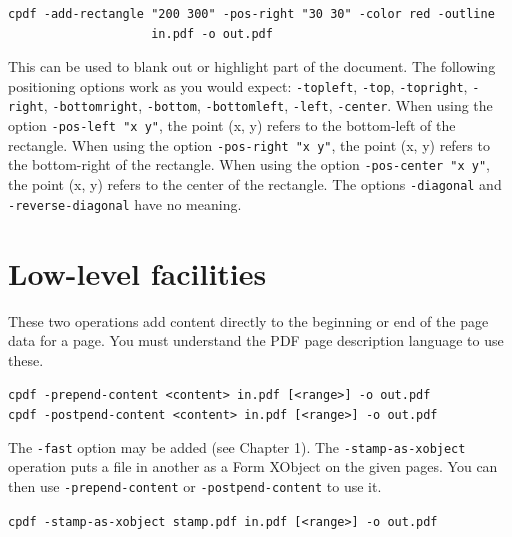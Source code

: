 \documentclass{book}
\begin{document}
\begin{framed}
  \small\begin{verbatim}
cpdf -add-rectangle "200 300" -pos-right "30 30" -color red -outline
                    in.pdf -o out.pdf\end{verbatim}
\end{framed}

\noindent This can be used to blank out or highlight part of the document. The following positioning options work as you would expect: \texttt{-topleft}, \texttt{-top}, \texttt{-topright}, \texttt{-right}, \texttt{-bottomright}, \texttt{-bottom}, \texttt{-bottomleft}, \texttt{-left}, \texttt{-center}. When using the option \texttt{-pos-left "x y"}, the point (x, y) refers to the bottom-left of the rectangle. When using the option \texttt{-pos-right "x y"}, the point (x, y) refers to the bottom-right of the rectangle. When using the option \texttt{-pos-center "x y"}, the point (x, y) refers to the center of the rectangle. The options \texttt{-diagonal} and \texttt{-reverse-diagonal} have no meaning.

\section{Low-level facilities}
\pagestyle{empty}\thispagestyle{fancy}
These two operations add content directly to the beginning or end of the page data for a page. You must understand the PDF page description language to use these.

\begin{framed}
  \noindent\small\verb!cpdf -prepend-content <content> in.pdf [<range>] -o out.pdf!\\

\vspace{1.5mm}
  \noindent\small\verb!cpdf -postpend-content <content> in.pdf [<range>] -o out.pdf!
\end{framed}

\noindent The \texttt{-fast} option may be added (see Chapter 1). The \texttt{-stamp-as-xobject} operation puts a file in another as a Form XObject on the given pages. You can then use \texttt{-prepend-content} or \texttt{-postpend-content} to use it.

\begin{framed}
  \noindent\small\verb!cpdf -stamp-as-xobject stamp.pdf in.pdf [<range>] -o out.pdf!
\end{framed}

\ \ \
\end{document}
